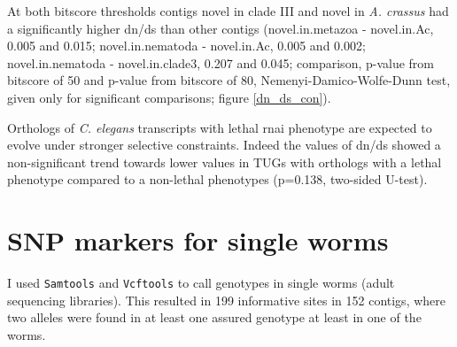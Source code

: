 At both bitscore thresholds contigs novel in clade III and novel in
\textit{A. crassus} had a significantly higher dn/ds than other
contigs (novel.in.metazoa - novel.in.Ac, 0.005 and 0.015;
novel.in.nematoda - novel.in.Ac, 0.005 and 0.002; novel.in.nematoda -
novel.in.clade3, 0.207 and 0.045; comparison, p-value from bitscore of
50 and p-value from bitscore of 80, Nemenyi-Damico-Wolfe-Dunn test,
given only for significant comparisons; figure \ref{dn_ds_con}).


Orthologs of \textit{C. elegans} transcripts with lethal rnai
phenotype are expected to evolve under stronger selective
constraints. Indeed the values of dn/ds showed a non-significant trend
towards lower values in TUGs with orthologs with a lethal phenotype
compared to a non-lethal phenotypes (p=0.138, two-sided U-test).

\section{SNP markers for single worms}

I used \texttt{Samtools}\cite{journals/bioinformatics/LiHWFRHMAD09}
and \texttt{Vcftools}\cite{pmid21653522} to call genotypes in single
worms (adult sequencing libraries). This resulted in 199 informative
sites in 152 contigs, where two alleles were found in at least one
assured genotype at least in one of the worms.

